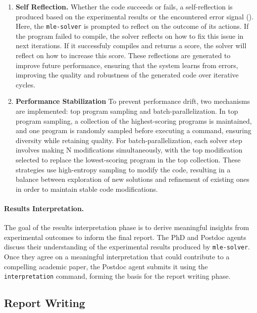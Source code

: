 \documentclass[11pt, a4paper]{gdm_format}
\begin{document}
\begin{enumerate}
    \item [D.] \textbf{Self Reflection.} Whether the code succeeds or fails, a self-reflection is produced based on the experimental results or the encountered error signal (\cite{shinn2024reflexion,renze2024self}). Here, the \texttt{mle-solver} is prompted to reflect on the outcome of its actions. If the program failed to compile, the solver reflects on how to fix this issue in next iterations. If it successfuly compiles and returns a score, the solver will reflect on how to increase this score. These reflections are generated to improve future performance, ensuring that the system learns from errors, improving the quality and robustness of the generated code over iterative cycles.
    \item [E.] \textbf{Performance Stabilization} To prevent performance drift, two mechanisms are implemented: top program sampling and batch-parallelization. In top program sampling, a collection of the highest-scoring programs is maintained, and one program is randomly sampled before executing a command, ensuring diversity while retaining quality. For batch-parallelization, each solver step involves making N modifications simultaneously, with the top modification selected to replace the lowest-scoring program in the top collection. These strategies use high-entropy sampling to modify the code, resulting in a balance between exploration of new solutions and refinement of existing ones in order to maintain stable code modifications. 
\end{enumerate}






\paragraph{Results Interpretation.} The goal of the results interpretation phase is to derive meaningful insights from experimental outcomes to inform the final report. The PhD and Postdoc agents discuss their understanding of the experimental results produced by \texttt{mle-solver}. Once they agree on a meaningful interpretation that could contribute to a compelling academic paper, the Postdoc agent submits it using the \texttt{interpretation} command, forming the basis for the report writing phase.



\subsection{Report Writing} 
\label{sec:report_writing}
\end{document}

